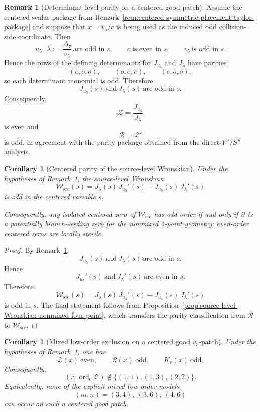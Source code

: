 \documentclass[11pt,a4paper]{amsart}
\theoremstyle{plain}
\newtheorem{corollary}[theorem]{Corollary}
\theoremstyle{definition}
\newtheorem{remark}[theorem]{Remark}
\begin{document}
\begin{remark}[Determinant-level parity on a centered good patch]
\label{rem:determinant-level-parity-centered-good-patch}
Assume the centered scalar package from
Remark~\ref{rem:centered-symmetric-placement-taylor-package} and suppose that
$x=v_5/c$ is being used as the induced odd collision-side coordinate.
Then
\[
u_5,\ \lambda:=\frac{\Delta_7}{v_5}\ \text{are odd in }s,
\qquad
c\ \text{is even in }s,
\qquad
v_5\ \text{is odd in }s.
\]
Hence the rows of the defining determinants for $J_{u_5}$ and $J_\lambda$
have parities
\[
(e,o,o),\qquad (o,e,e),\qquad (e,o,o),
\]
so each determinant monomial is odd. Therefore
\[
J_{u_5}(s)\ \text{and}\ J_\lambda(s)\ \text{are odd in }s.
\]
Consequently,
\[
\mathcal Z=\frac{J_{u_5}}{J_\lambda}
\]
is even and
\[
\mathcal R=\mathcal Z'
\]
is odd, in agreement with the parity package obtained from the direct
$Y''/S''$-analysis.
\end{remark}

\begin{corollary}[Centered parity of the source-level Wronskian]
\label{cor:centered-parity-source-level-Wronskian}
Under the hypotheses of
Remark~\ref{rem:determinant-level-parity-centered-good-patch}, the source-level
Wronskian
\[
\mathcal W_{\mathrm{src}}(s)
=
J_\lambda(s)\,J_{u_5}'(s)-J_{u_5}(s)\,J_\lambda'(s)
\]
is odd in the centered variable $s$.

Consequently, any isolated centered zero of $\mathcal W_{\mathrm{src}}$ has
odd order if and only if it is a potentially branch-seeding zero for the
nonmixed $4$-point geometry; even-order centered zeros are locally sterile.
\end{corollary}

\begin{proof}
By Remark~\ref{rem:determinant-level-parity-centered-good-patch},
\[
J_{u_5}(s)\ \text{and}\ J_\lambda(s)\ \text{are odd in }s.
\]
Hence
\[
J_{u_5}'(s)\ \text{and}\ J_\lambda'(s)\ \text{are even in }s.
\]
Therefore
\[
\mathcal W_{\mathrm{src}}(s)
=
J_\lambda(s)\,J_{u_5}'(s)-J_{u_5}(s)\,J_\lambda'(s)
\]
is odd in $s$. The final statement follows from
Proposition~\ref{prop:source-level-Wronskian-nonmixed-four-point}, which
transfers the parity classification from $\mathcal R$ to
$\mathcal W_{\mathrm{src}}$.
\end{proof}

\begin{corollary}[Mixed low-order exclusion on a centered good $v_5$-patch]
\label{cor:mixed-low-order-exclusion-centered-good-v5-patch}
Under the hypotheses of
Remark~\ref{rem:determinant-level-parity-centered-good-patch}, one has
\[
\mathcal Z(x)\ \text{even},
\qquad
\mathcal R(x)\ \text{odd},
\qquad
K_v(x)\ \text{odd}.
\]
Consequently,
\[
(r,\operatorname{ord}_0\mathcal Z)\notin\{(1,1),(1,3),(2,2)\}.
\]
Equivalently, none of the explicit mixed low-order models
\[
(m,n)=(3,4),\ (3,6),\ (4,6)
\]
can occur on such a centered good patch.
\end{corollary}
\end{document}
